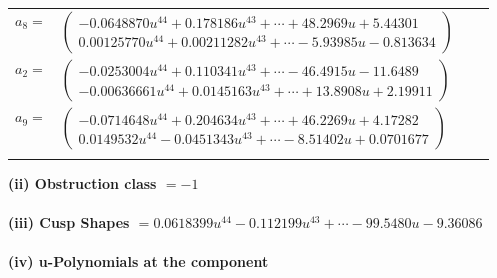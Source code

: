 \documentclass[1p]{elsarticle_modified}
\theoremstyle{definition}
\begin{document}
\begin{tabular}{m{7pt} m{180pt} m{7pt} m{180pt} }
\flushright $a_{8}=$&$\begin{pmatrix}-0.0648870 u^{44}+0.178186 u^{43}+\cdots+48.2969 u+5.44301\\0.00125770 u^{44}+0.00211282 u^{43}+\cdots-5.93985 u-0.813634\end{pmatrix}$ \\
\flushright $a_{2}=$&$\begin{pmatrix}-0.0253004 u^{44}+0.110341 u^{43}+\cdots-46.4915 u-11.6489\\-0.00636661 u^{44}+0.0145163 u^{43}+\cdots+13.8908 u+2.19911\end{pmatrix}$ \\
\flushright $a_{9}=$&$\begin{pmatrix}-0.0714648 u^{44}+0.204634 u^{43}+\cdots+46.2269 u+4.17282\\0.0149532 u^{44}-0.0451343 u^{43}+\cdots-8.51402 u+0.0701677\end{pmatrix}$\\&\end{tabular}
\flushleft \textbf{(ii) Obstruction class $= -1$}\\~\\
\flushleft \textbf{(iii) Cusp Shapes $= 0.0618399 u^{44}-0.112199 u^{43}+\cdots-99.5480 u-9.36086$}\\~\\
\newpage\renewcommand{\arraystretch}{1}
\flushleft \textbf{(iv) u-Polynomials at the component}\newline \\
\end{document}
